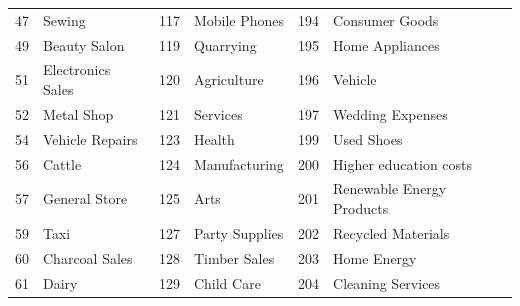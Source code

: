 \begin{longtable}[]{|r|l|r|l|r|l|}
	47                                & Sewing                             & 117                               & Mobile Phones                      & 194                               & Consumer Goods                     \\
	49                                & Beauty Salon                       & 119                               & Quarrying                          & 195                               & Home Appliances                    \\
	51                                & Electronics Sales                  & 120                               & Agriculture                        & 196                               & Vehicle                            \\
	52                                & Metal Shop                         & 121                               & Services                           & 197                               & Wedding Expenses                   \\
	54                                & Vehicle Repairs                    & 123                               & Health                             & 199                               & Used Shoes                         \\
	56                                & Cattle                             & 124                               & Manufacturing                      & 200                               & Higher education costs             \\
	57                                & General Store                      & 125                               & Arts                               & 201                               & Renewable Energy Products          \\
	59                                & Taxi                               & 127                               & Party Supplies                     & 202                               & Recycled Materials                 \\
	60                                & Charcoal Sales                     & 128                               & Timber Sales                       & 203                               & Home Energy                        \\
	61                                & Dairy                              & 129                               & Child Care                         & 204                               & Cleaning Services                  \\

\end{longtable}
